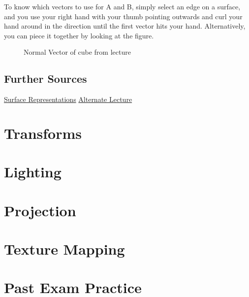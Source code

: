 To know which vectors to use for A and B, simply select an edge on a surface, and you use your right hand with your thumb pointing outwards and curl your hand around in the direction until the first vector hits your hand. Alternatively, you can piece it together by looking at the figure.
  \begin{figure}[!htb]
	\caption{\label{fig:csg} Normal Vector of cube from lecture}
\end{figure}

\subsection{Further Sources}
	\href{https://www.tutorialspoint.com/computer_graphics/computer_graphics_surfaces.htm}{Surface Representations}
	\newline
	\href{https://www.cs.cmu.edu/afs/cs/academic/class/15462-s09/www/lec/04/lec04.pdf}{Alternate Lecture}
\newpage
\section{Transforms}

\newpage
\section{Lighting}
\newpage
\section{Projection}
\newpage
\section{Texture Mapping}
\newpage
\section{Past Exam Practice}